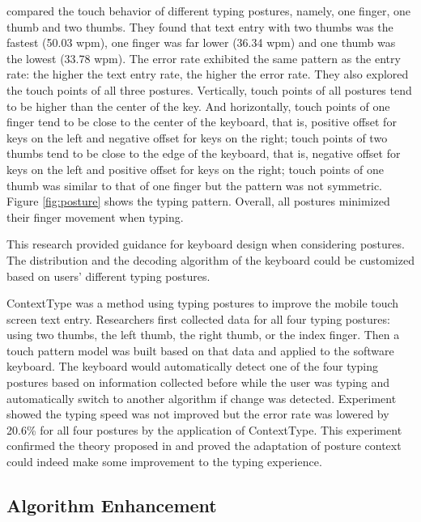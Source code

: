 \documentclass[11pt]{article}
\begin{document}
\citet{10.1145/2371574.2371612} compared the touch behavior of different typing postures, namely, one finger, one thumb and two thumbs. They found that text entry with two thumbs was the fastest (50.03 wpm), one finger was far lower (36.34 wpm) and one thumb was the lowest (33.78 wpm). The error rate exhibited the same pattern as the entry rate: the higher the text entry rate, the higher the error rate. They also explored the touch points of all three postures. Vertically, touch points of all postures tend to be higher than the center of the key. And horizontally, touch points of one finger tend to be close to the center of the keyboard, that is, positive offset for keys on the left and negative offset for keys on the right; touch points of two thumbs tend to be close to the edge of the keyboard, that is, negative offset for keys on the left and positive offset for keys on the right; touch points of one thumb was similar to that of one finger but the pattern was not symmetric. Figure \ref{fig:posture} shows the typing pattern. Overall, all postures minimized their finger movement when typing. 

This research provided guidance for keyboard design when considering postures. The distribution and the decoding algorithm of the keyboard could be customized based on users' different typing postures.

ContextType \citep{10.1145/2470654.2481386} was a method using typing postures to improve the mobile touch screen text entry. Researchers first collected data for all four typing postures: using two thumbs, the left thumb, the right thumb, or the index finger. Then a touch pattern model was built based on that data and applied to the software keyboard. The keyboard would automatically detect one of the four typing postures based on information collected before while the user was typing and automatically switch to another algorithm if change was detected. Experiment showed the typing speed was not improved but the error rate was lowered by 20.6\% for all four postures by the application of ContextType. This experiment confirmed the theory proposed in \citet{10.1145/2371574.2371612} and proved the adaptation of posture context could indeed make some improvement to the typing experience.

\subsection{Algorithm Enhancement}

\newpage


\end{document}
